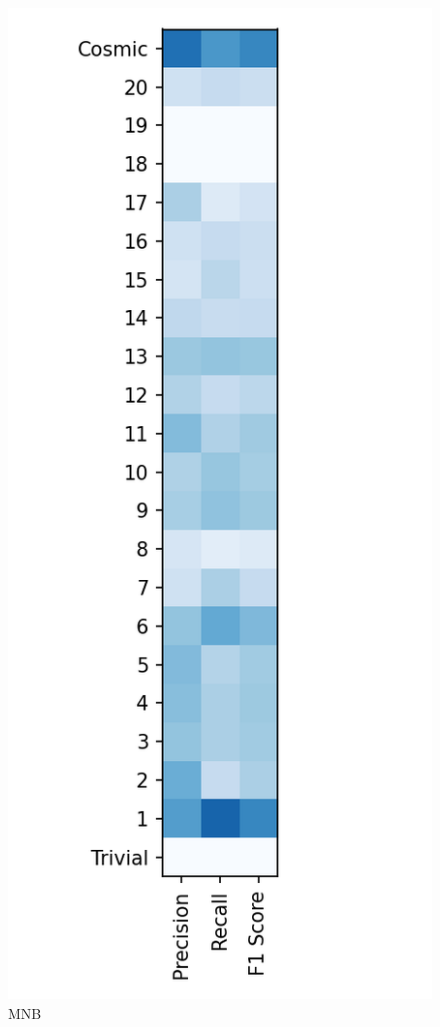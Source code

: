 \documentclass{article}
\begin{document}
\begin{figure}[ht]
\begin{minipage}[b]{0.32\linewidth}
			\caption*{MNB} 
			\vspace{10ex}
		\end{minipage}
		\begin{minipage}[b]{0.32\linewidth}
			\centering
			\includegraphics[width=\linewidth]{22 - Random Forest.png} 

\end{minipage}
\end{figure}
\end{document}
